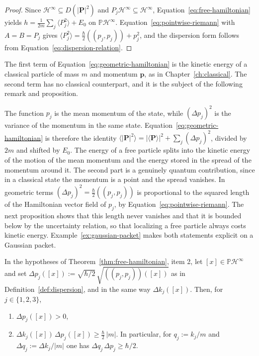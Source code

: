 \begin{proof}
	Since $\mathcal{H}^\infty\subseteq D(|\mathbf{P}|^2)$ and $P_j\mathcal{H}^\infty\subseteq\mathcal{H}^\infty$, Equation~\eqref{eq:free-hamiltonian} yields $h=\tfrac{1}{2m}\sum_j\langle P_j^2\rangle+E_0$ on $\mathbb{P}\mathcal{H}^\infty$. Equation~\eqref{eq:pointwise-riemann} with $A=B=P_j$ gives $\langle P_j^2\rangle=\tfrac{\hbar}{2}((p_j,p_j))+p_j^2$, and the dispersion form follows from Equation~\eqref{eq:dispersion-relation}.
\end{proof}

\noindent The first term of Equation~\eqref{eq:geometric-hamiltonian} is the kinetic energy of a classical particle of mass $m$ and momentum $\mathbf{p}$, as in Chapter~\ref{ch:classical}. The second term has no classical counterpart, and it is the subject of the following remark and proposition.

\begin{remark}\label{rem:dispersion-term}
	The function $p_j$ is the mean momentum of the state, while $(\Delta p_j)^2$ is the variance of the momentum in the same state. Equation~\eqref{eq:geometric-hamiltonian} is therefore the identity $\langle|\mathbf{P}|^2\rangle=|\langle\mathbf{P}\rangle|^2+\sum_j(\Delta p_j)^2$, divided by $2m$ and shifted by $E_0$. The energy of a free particle splits into the kinetic energy of the motion of the mean momentum and the energy stored in the spread of the momentum around it. The second part is a genuinely quantum contribution, since in a classical state the momentum is a point and the spread vanishes. In geometric terms $(\Delta p_j)^2=\tfrac{\hbar}{2}((p_j,p_j))$ is proportional to the squared length of the Hamiltonian vector field of $p_j$, by Equation~\eqref{eq:pointwise-riemann}. The next proposition shows that this length never vanishes and that it is bounded below by the uncertainty relation, so that localizing a free particle always costs kinetic energy. Example~\ref{ex:gaussian-packet} makes both statements explicit on a Gaussian packet.
\end{remark}

\begin{proposition}\label{prop:dispersion-positive}
	In the hypotheses of Theorem~\ref{thm:free-hamiltonian}, item 2, let $[x]\in\mathbb{P}\mathcal{H}^\infty$ and set $\Delta p_j([x]):=\sqrt{\hbar/2}\,\sqrt{((p_j,p_j))([x])}$ as in Definition~\ref{def:dispersion}, and in the same way $\Delta k_j([x])$. Then, for $j\in\{1,2,3\}$,
	\begin{enumerate}
		\item $\Delta p_j([x])>0$,
		\item $\Delta k_j([x])\,\Delta p_j([x])\ge\frac{\hbar}{2}\,|m|$. In particular, for $q_j:=k_j/m$ and $\Delta q_j:=\Delta k_j/|m|$ one has $\Delta q_j\,\Delta p_j\ge\hbar/2$.
	\end{enumerate}
\end{proposition}

